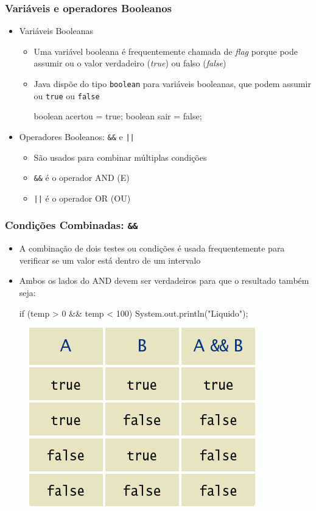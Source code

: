\documentclass[xcolor={dvipsnames,table},aspectratio=169]{beamer}
\begin{document}
\begin{frame}[fragile]\frametitle{Variáveis e operadores Booleanos}
\begin{itemize}
	\item Variáveis Booleanas
	\begin{itemize}
		\item Uma variável booleana é frequentemente chamada de \emph{flag} porque pode assumir ou o valor verdadeiro (\emph{true}) ou falso (\emph{false})
		\item Java dispõe do tipo \texttt{boolean} para variáveis booleanas, que podem assumir ou \texttt{true} ou \texttt{false}
\begin{javacode}
boolean acertou = true;
boolean sair = false;
\end{javacode}
	\end{itemize}
	\item Operadores Booleanos: \texttt{\&\&} e \texttt{||}
	\begin{itemize}
		\item São usados para combinar múltiplas condições
		\item \texttt{\&\&} é o operador AND (E)
		\item \texttt{||} é o operador OR (OU)
	\end{itemize}
\end{itemize}
\end{frame}

\begin{frame}[fragile]\frametitle{Condições Combinadas: \texttt{\&\&}}
\begin{itemize}
	\item A combinação de dois testes ou condições é usada frequentemente para verificar se um valor está dentro de um intervalo
	\item Ambos os lados do AND devem ser verdadeiros para que o resultado também seja:
{\scriptsize
\begin{javacode}
if (temp > 0 && temp < 100) {
  System.out.println("Liquido"); 
}
\end{javacode}
}
\end{itemize}
\begin{figure}[h]
	\includegraphics[height=0.35\paperheight,center]{pucrs-ep-fprog-unidade_03-decisoes-laminas-and.png}
\end{figure}
\end{frame}
\end{document}
